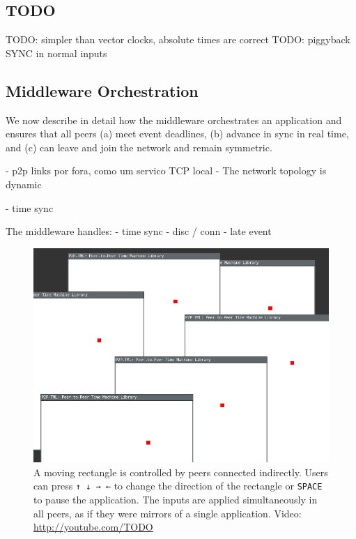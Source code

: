 \documentclass[10pt,journal,compsoc]{IEEEtran}
\newcommand{\code}[1]  {\texttt{\footnotesize{#1}}}
\begin{document}
\subsection{TODO}

TODO: simpler than vector clocks, absolute times are correct
TODO: piggyback SYNC in normal inputs

\subsection{Middleware Orchestration}
\label{sec.tml.middleware}

We now describe in detail how the middleware orchestrates an application and
ensures that all peers (a) meet event deadlines, (b) advance in sync in real
time, and (c) can leave and join the network and remain symmetric.



- p2p links por fora, como um servico TCP local
- The network topology is dynamic


%
- time sync

The middleware handles:
- time sync
- disc / conn
- late event

\begin{figure}[t]
    \centering
    \includegraphics[width=\linewidth]{move}
    \caption[XXX] {
        A moving rectangle is controlled by peers connected indirectly.
        Users can press \code{↑ ↓ → ←} to change the direction of the
        rectangle or \code{SPACE} to pause the application.
        The inputs are applied simultaneously in all peers, as if they were
        mirrors of a single application.
        Video: \url{http://youtube.com/TODO}
        \label{fig.move}
    }
\end{figure}
\end{document}
